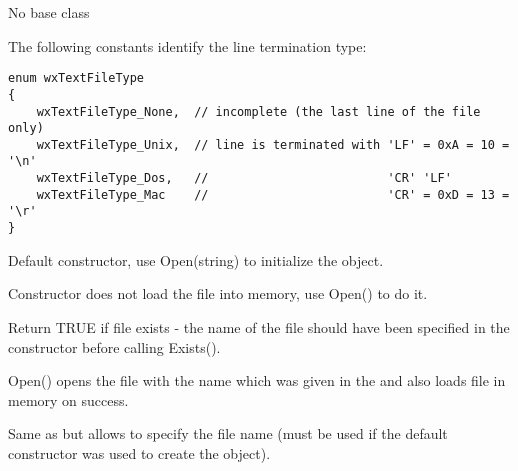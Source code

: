 


No base class


The following constants identify the line termination type:
\begin{verbatim}
enum wxTextFileType
{
    wxTextFileType_None,  // incomplete (the last line of the file only)
    wxTextFileType_Unix,  // line is terminated with 'LF' = 0xA = 10 = '\n'
    wxTextFileType_Dos,   //                         'CR' 'LF'
    wxTextFileType_Mac    //                         'CR' = 0xD = 13 = '\r'
}
\end{verbatim}


\label{wxtextfilectordef}

Default constructor, use Open(string) to initialize the object.

\label{wxtextfilector}


Constructor does not load the file into memory, use Open() to do it. 

\label{wxtextfileexists}


Return TRUE if file exists - the name of the file should have been specified
in the constructor before calling Exists().

\label{wxtextfileopen}


Open() opens the file with the name which was given in the  
and also loads file in memory on success.

\label{wxtextfileopenname}


Same as  but allows to specify the file name
(must be used if the default constructor was used to create the object).

\label{wxtextfileclose}

